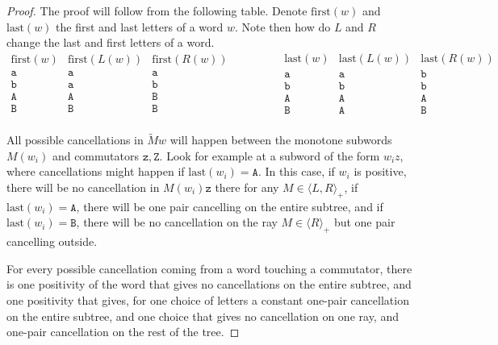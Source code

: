\documentclass{article}
\begin{document}
	\begin{proof}
		The proof will follow from the following table. Denote $\mathrm{first}(w)$ and $\mathrm{last}(w)$ the first and last letters of a word $w$. Note then how do $L$ and $R$ change the last and first letters of a word.
		\[
		\begin{matrix}
			\mathrm{first}(w)&  \mathrm{first}(L(w)) &    \mathrm{first}(R(w)) \\
			\mathtt{a} &  \mathtt{a}   & \mathtt{a} \\
			\mathtt{b} &  \mathtt{a}   & \mathtt{b} \\
			\mathtt{A} &  \mathtt{A}   & \mathtt{B} \\
			\mathtt{B} &  \mathtt{B}   & \mathtt{B} \\
		\end{matrix}\hspace{50pt} 
		\begin{matrix}
			\mathrm{last}(w) & \mathrm{last}(L(w))  & \mathrm{last}(R(w))  \\
			\mathtt{a} & \mathtt{a} & \mathtt{b} \\
			\mathtt{b} & \mathtt{b} & \mathtt{b} \\
			\mathtt{A} & \mathtt{A} & \mathtt{A} \\
			\mathtt{B} & \mathtt{A} & \mathtt{B} \\
		\end{matrix}
		\]
		
		
		All possible cancellations in $\tilde{M}w$ will happen between the monotone subwords $M(w_i)$ and commutators $\mathtt{z,Z}$. Look for example at a subword of the form $w_i z$, where cancellations might happen if $\mathrm{last}(w_i)=\mathtt{A}$. In this case, if $w_i$ is positive, there will be no cancellation in $ M(w_i)\mathtt{z}$ there for any $M\in \langle L, R\rangle_+$, if $\mathrm{last}(w_i)=\mathtt{A}$, there will be one pair cancelling on the entire subtree, and if $\mathrm{last}(w_i)=\mathtt{B}$, there will be no cancellation on the ray $M\in \langle R\rangle_+ $ but one pair cancelling outside.
		
		For every possible cancellation coming from a word touching a commutator, there is one positivity of the word that gives no cancellations on the entire subtree, and one positivity that gives, for one choice of letters a constant one-pair cancellation on the entire subtree, and one choice that gives no cancellation on one ray, and one-pair cancellation on the rest of the tree.
	\end{proof}
	
\end{document}
